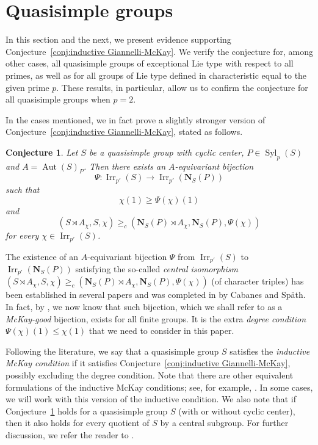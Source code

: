 \documentclass[12pt]{amsart}
\theoremstyle{plain}
\newtheorem{conj}[thm]{Conjecture}
\theoremstyle{definition}
\numberwithin{equation}{section}
\newcommand{\Syl}{\operatorname{Syl}}
\newcommand{\Aut}{\operatorname{Aut}}
\newcommand{\Irr}{\operatorname{Irr}}
\newcommand{\bN}{\mathbf{N}}
\begin{document}

\section{Quasisimple groups}\label{sec:quasisimple}

In this section and the next, we present evidence supporting
Conjecture~\ref{conj:inductive Giannelli-McKay}. We verify the
conjecture for, among other cases, all quasisimple groups of
exceptional Lie type with respect to all primes, as well as for all
groups of Lie type defined in characteristic equal to the given
prime $p$. These results, in particular, allow us to confirm the
conjecture for all quasisimple groups when $p=2$.

In the cases mentioned, we in fact prove a slightly stronger version
of Conjecture~\ref{conj:inductive Giannelli-McKay}, stated as
follows.

\begin{conj}\label{thm:simple}
Let $S$ be a quasisimple group with cyclic center, $P\in\Syl_p(S)$
and $A=\Aut(S)_P$. Then there exists an $A$-equivariant bijection
$$\Psi:\Irr_{p'}(S)\rightarrow\Irr_{p'}(\bN_S(P))$$ such that
\[\chi(1)\geq\Psi(\chi)(1)\] and $$(S\rtimes
A_\chi,S,\chi)\geq_c(\bN_S(P)\rtimes A_\chi,\bN_S(P) , \Psi(\chi))$$
for every $\chi\in\Irr_{p'}(S)$.
\end{conj}

The existence of an $A$-equivariant bijection $\Psi$ from
$\Irr_{p'}(S)$ to $\Irr_{p'}(\bN_S(P))$ satisfying the so-called
\emph{central isomorphism} $(S\rtimes
A_\chi,S,\chi)\geq_c(\bN_S(P)\rtimes A_\chi,\bN_S(P) , \Psi(\chi))$
(of character triples) has been established in several papers and
was completed in \cite{CS} by Cabanes and Sp\"{a}th. In fact, by
\cite[Theorem~B]{CS}, we now know that such bijection, which we
shall refer to as a \emph{McKay-good} bijection, exists for all
finite groups. It is the extra \emph{degree condition}
$\Psi(\chi)(1)\leq\chi(1)$ that we need to consider in this paper.

Following the literature, we say that a quasisimple group $S$
satisfies the \emph{inductive McKay condition} if it satisfies
Conjecture~\ref{conj:inductive Giannelli-McKay}, possibly excluding
the degree condition. Note that there are other equivalent
formulations of the inductive McKay conditions; see, for example,
\cite[\S 10]{IMN07}. In some cases, we will work with this version
of the inductive condition. We also note that if
Conjecture~\ref{thm:simple} holds for a quasisimple group $S$ (with
or without cyclic center), then it also holds for every quotient of
$S$ by a central subgroup. For further discussion, we refer the
reader to \cite[Remark~2.9]{CS}.
\end{document}
